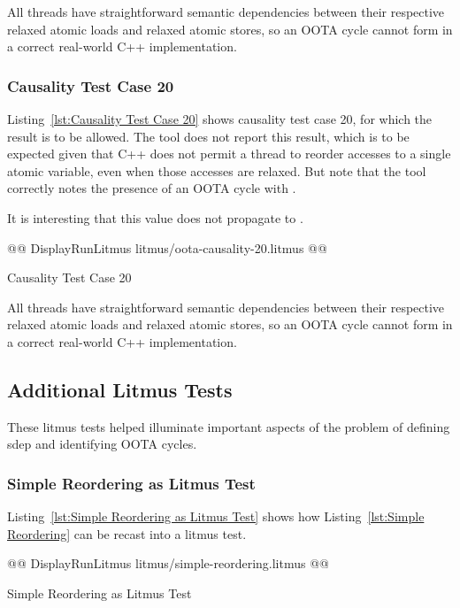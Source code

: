 \documentclass[10]{article}
\begin{document}
All threads have straightforward semantic dependencies between their
respective relaxed atomic loads and relaxed atomic stores, so an OOTA
cycle cannot form in a correct real-world C++ implementation.

\subsubsection{Causality Test Case 20}
\label{app:Causality Test Case 20}

Listing~\ref{lst:Causality Test Case 20}
shows causality test case 20, for which the 
result is to be allowed.
The  tool does not report this result, which is to be expected
given that C++ does not permit a thread to reorder accesses to a single
atomic variable, even when those accesses are relaxed.
But note that the  tool correctly notes the presence of an
OOTA cycle with .

It is interesting that this  value does not propagate to
.

\begin{listing}[tbp]
@@ DisplayRunLitmus litmus/oota-causality-20.litmus @@
\caption{Causality Test Case 20}
\label{lst:Causality Test Case 20}
\end{listing}

All threads have straightforward semantic dependencies between their
respective relaxed atomic loads and relaxed atomic stores, so an OOTA
cycle cannot form in a correct real-world C++ implementation.

\subsection{Additional Litmus Tests}
\label{app:Additional Litmus Tests}

These litmus tests helped illuminate important aspects of the problem
of defining sdep and identifying OOTA cycles.

\subsubsection{Simple Reordering as Litmus Test}
\label{app:Simple Reordering as Litmus Test}

Listing~\ref{lst:Simple Reordering as Litmus Test}
shows how
Listing~\ref{lst:Simple Reordering}
can be recast into a  litmus test.

\begin{listing}[tbp]
@@ DisplayRunLitmus litmus/simple-reordering.litmus @@
\caption{Simple Reordering as Litmus Test}
\label{lst:Simple Reordering as Litmus Test}
\end{listing}
\end{document}
